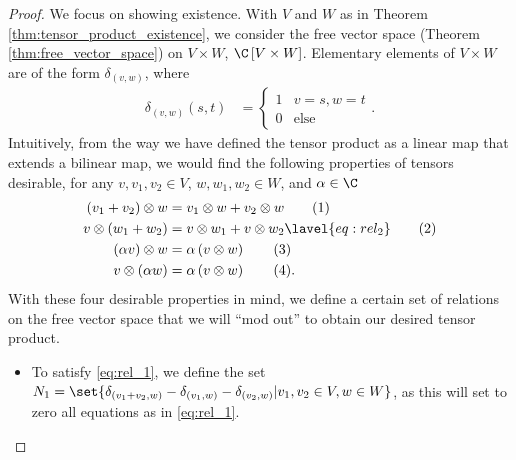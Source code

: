 \begin{proof}
  We focus on showing existence. With $V$ and $W$ as in Theorem \ref{thm:tensor_product_existence}, we consider the free vector space (Theorem \ref{thm:free_vector_space}) on $V\times W$, $\C\left[ V\times W \right]$. Elementary elements of $V\times W$ are of the form $\delta_{(v,w)}$, where
  \begin{align*}
    \delta_{(v,w)} \left( s,t \right) &= \begin{cases}
      1 & v=s,w=t\\
      0 & \text{else}
    \end{cases}.
  \end{align*}
  Intuitively, from the way we have defined the tensor product as a linear map that extends a bilinear map, we would find the following properties of tensors desirable, for any $v,v_1,v_2\in V$, $w,w_1,w_2\in W$, and $\alpha\in \C$
  \begin{align*}
    \left( v_1 + v_2 \right)\otimes w &= v_1\otimes w + v_2\otimes w\label{eq:rel_1}\tag{1}\\
    v\otimes\left( w_1 + w_2 \right) &= v\otimes w_1 + v\otimes w_2\lavel{eq:rel_2}\tag{2}\\
    \left( \alpha v \right)\otimes w &= \alpha \left( v\otimes w \right)\label{eq:rel_3}\tag{3}\\
    v\otimes \left( \alpha w \right) &= \alpha \left( v\otimes w \right)\label{eq:rel_4}\tag{4}.
  \end{align*}
  With these four desirable properties in mind, we define a certain set of relations on the free vector space that we will ``mod out'' to obtain our desired tensor product. 
  \begin{itemize}
    \item To satisfy \eqref{eq:rel_1}, we define the set $N_1 = \set{\delta_{\left( v_1 + v_2,w \right)} - \delta_{\left( v_1,w \right)} - \delta_{\left( v_2,w \right)} | v_1,v_2\in V,w\in W}$, as this will set to zero all equations as in \ref{eq:rel_1}.
  \end{itemize}
\end{proof}

